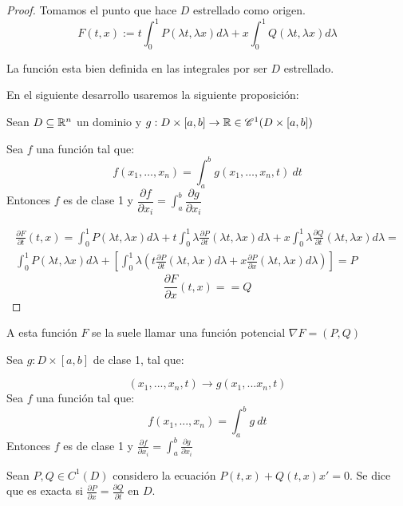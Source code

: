 \begin{proof}
Tomamos el punto que hace $D$ estrellado como origen.
\[
F(t,x) := t \int _0 ^1 P(\lambda t, \lambda x) d\lambda + x \int _0 ^1 Q(\lambda t, \lambda x ) d\lambda
\]

La función esta bien definida en las integrales por ser $D$ estrellado.

En el siguiente desarrollo usaremos la siguiente proposición:

\begin{nprop}
  Sean $D \subseteq \mathbb{R}^n$ un dominio y $g: D\times [a,b] \to \mathbb{R} \in \mathscr{C}^1(D\times [a,b])$

Sea $f$ una función tal que: 
\[
f(x_1,\dots,x_n) = \int _a ^b g(x_1,\dots,x_n,t) \ dt
\]
Entonces $f$ es de clase 1 y $\dfrac{\partial f}{\partial x_i} = \displaystyle\int _a ^b \dfrac{\partial g}{\partial x_i}$


\end{nprop}

\[
\begin{array}{l}
  \frac{\partial F}{\partial t} (t,x) = \int _0 ^1 P(\lambda t, \lambda x) d\lambda + t \int _0 ^1 \lambda \frac{\partial P}{\partial t}(\lambda t, \lambda x) d\lambda + x\int _0 ^1 \lambda \frac{\partial Q}{\partial t}(\lambda t, \lambda x) d\lambda =\\
  \int_0^1 P(\lambda t, \lambda x)d\lambda + \left[\int_0^1 \lambda\left( t\frac{\partial P}{\partial t}(\lambda t, \lambda x)d\lambda + x\frac{\partial P}{\partial x}(\lambda t, \lambda x)d\lambda \right) \right] = P
\end{array}
\]
\[
\frac{\partial F}{\partial x} (t,x) =  = Q
\]

\end{proof}

A esta función $F$ se la suele llamar una función potencial $\nabla F = (P,Q)$

\begin{nth}
Sea $g: D\times [a,b]$ de clase 1, tal que: 

\[
(x_1,..., x_n, t) \to g(x_1,... x_n, t)
\]
Sea $f$ una función tal que: 
\[
f(x_1,...,x_n) = \int _a ^b g \ dt
\]
Entonces $f$ es de clase 1 y $\frac{\partial f}{\partial x_i} = \int _a ^b \frac{\partial g}{\partial x_i}$


\end{nth}
\begin{ndef}
Sean $P,Q \in C^1 (D)$ considero la ecuación $P(t,x) + Q(t,x) x' = 0$. Se dice que es exacta si $\frac{\partial P}{\partial x} = \frac{\partial Q}{\partial t}$ en $D$.
\end{ndef}

